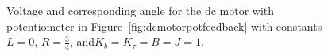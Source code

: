 \begin{excersizelist}
\begin{solution}
\begin{figure}[tp]
  \centering
  \caption{Voltage and corresponding angle for the dc motor with potentiometer in Figure~\ref{fig:dcmotorpotfeedback} with constants $L =0$, $R = \tfrac{3}{4}$, and$K_b=K_\tau=B=J=1$.} \label{fig:dcmotorpotfeedbackdcmotoranim}
\end{figure}







\end{solution}
\end{excersizelist}
